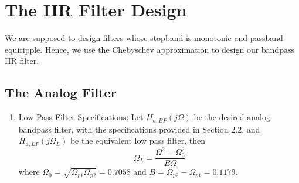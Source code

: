 \documentclass{article}
\begin{document}
\section{The IIR Filter Design}
We are supposed to design filters whose stopband is monotonic and passband equiripple.  
Hence, we use the Chebyschev approximation to design our bandpass IIR filter.
\subsection{The Analog Filter}
\begin{enumerate}

\item {Low Pass Filter Specifications:}  Let $H_{a, BP}(j\Omega)$ be the desired analog bandpass filter,  with the specifications provided in Section 2.2, and $H_{a,LP}(j\Omega_L)$ be the equivalent low pass filter, then
\begin{equation}
\Omega_L = \frac{\Omega^2 - \Omega_0^2}{B\Omega} \label{eq:freq_transform}
\end{equation}
where $\Omega_0 = \sqrt{\Omega_{p1}\Omega_{p2}} = 0.7058$ and $B = \Omega_{p2} - \Omega_{p1} = 0.1179$.


\end{enumerate}
\end{document}
